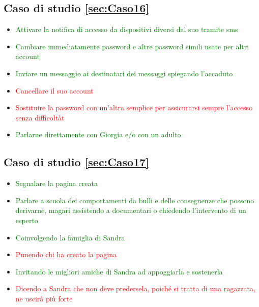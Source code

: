 \documentclass{article}
\begin{document}
\subsection{Caso di studio \ref{sec:Caso16}}
\begin{itemize}
	\item \textcolor{green}{Attivare la notifica di accesso da dispositivi diversi dal suo tramite sms}
	\item \textcolor{green}{Cambiare immediatamente password e altre password simili usate per altri account}
	\item \textcolor{green}{Inviare un messaggio ai destinatari dei messaggi spiegando l’accaduto}
	\item \textcolor{red}{Cancellare il suo account}
	\item \textcolor{red}{Sostituire la password con un’altra semplice per assicurarsi sempre l’accesso senza difficoltàt}
	\item \textcolor{green}{Parlarne direttamente con Giorgia e/o con un adulto}
\end{itemize}
\subsection{Caso di studio \ref{sec:Caso17}}
\begin{itemize}
	\item \textcolor{green}{Segnalare la pagina creata}
	\item \textcolor{green}{Parlare a scuola dei comportamenti da bulli e delle conseguenze che possono derivarne, magari assistendo a documentari o chiedendo l'intervento di un esperto}
	\item \textcolor{green}{Coinvolgendo la famiglia di Sandra}
	\item \textcolor{red}{Punendo chi ha creato la pagina}
	\item \textcolor{green}{Invitando le migliori amiche di Sandra ad appoggiarla e sostenerla}
	\item \textcolor{red}{Dicendo a Sandra che non deve predersela, poiché si tratta di una ragazzata, ne uscirà più forte}
\end{itemize}
\end{document}
